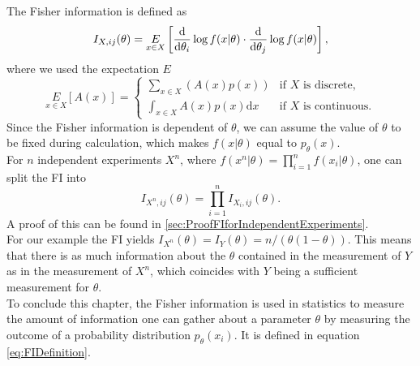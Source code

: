 The Fisher information is defined as 
\begin{equation}\label{eq:FIDefinition}
	I_{X,ij}(\theta) = \underset{x\in X}{E} \left[\frac{\mathrm{d}}{\mathrm{d}\theta_i}\log f(x|\theta) \cdot \frac{\mathrm{d}}{\mathrm{d}\theta_j}\log f(x|\theta)\right],
\end{equation}
where we used the expectation $E$
\begin{equation}
	\underset{x\in X}{E} \left[A(x)\right] = 
	\begin{cases}
		\sum_{x\in X} \left(A(x) p(x)\right) &\text{if $X$ is discrete},\\
		\int_{x\in X} A(x) p(x) \mathrm{d}x &\text{if $X$ is continuous}.
	\end{cases}
\end{equation}
Since the Fisher information is dependent of $\theta$, we can assume the value of $\theta$ to be fixed during calculation, which makes $f(x|\theta)$ equal to $p_\theta(x)$.\\ 
For $n$ independent experiments $X^n$, where $f(x^n|\theta) = \prod_{i=1}^n f(x_i|\theta)$, one can split the FI into 
\begin{equation}\label{eq:FIforIndependentExperiments}
	I_{X^n,ij}(\theta) = \prod_{i=1}^n I_{X_i,ij}(\theta).
\end{equation}
A proof of this can be found in \cref{sec:ProofFIforIndependentExperiments}.\\
For our example the FI yields $I_{X^n}(\theta) = I_{Y}(\theta) = n/(\theta(1-\theta))$\cite{StatisticFisherInfoTutorial}. This means that there is as much information about the $\theta$ contained in the measurement of $Y$ as in the measurement of $X^n$, which coincides with $Y$ being a sufficient measurement for $\theta$. \\
To conclude this chapter, the Fisher information is used in statistics to measure the amount of information one can gather about a parameter $\theta$ by measuring the outcome of a probability distribution $p_\theta(x_i)$. It is defined in equation \cref{eq:FIDefinition}.
